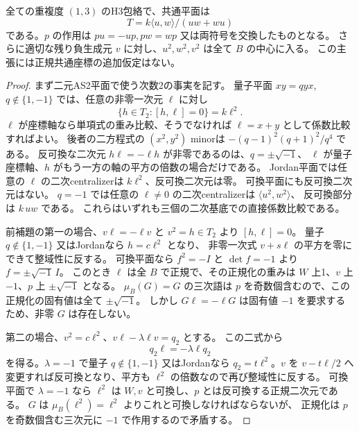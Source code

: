 \begin{theorem}[負三次元側の共通平面は常に量子パラメータ $-1$]
\label{thm:h3-order2-global-minus-one-plane}
全ての重複度 $(1,3)$ のH3包絡で、共通平面は
\[
 T=k\langle u,w\rangle/(uw+wu)
\]
である。$p$ の作用は $pu=-up,pw=wp$ 又は両符号を交換したものとなる。
さらに適切な残り負生成元 $v$ に対し、$u^2,w^2,v^2$ は全て $B$ の中心に入る。
この主張には正規共通座標の追加仮定はない。
\end{theorem}
\begin{proof}
まず二元AS2平面で使う次数2の事実を記す。
量子平面 $xy=qyx$, $q\notin\{1,-1\}$ では、任意の非零一次元 $\ell$ に対し
\[
 \{h\in T_2:[h,\ell]=0\}=k\ell^2.
\]
$\ell$ が座標軸なら単項式の重み比較、そうでなければ $\ell=x+y$ として係数比較すればよい。
後者の二方程式の $(x^2,y^2)$ minorは $-(q-1)^2(q+1)^2/q^4$ である。
反可換な二次元 $h\ell=-\ell h$ が非零であるのは、$q=\pm\sqrt{-1}$、
$\ell$ が量子座標軸、$h$ がもう一方の軸の平方の倍数の場合だけである。
Jordan平面では任意の $\ell$ の二次centralizerは $k\ell^2$、反可換二次元は零。
可換平面にも反可換二次元はない。
$q=-1$ では任意の $\ell\ne0$ の二次centralizerは $\langle u^2,w^2\rangle$、
反可換部分は $k\,uw$ である。
これらはいずれも三個の二次基底での直接係数比較である。

前補題の第一の場合、$v\ell=-\ell v$ と $v^2=h\in T_2$ より $[h,\ell]=0$。
量子 $q\notin\{1,-1\}$ 又はJordanなら $h=c\ell^2$ となり、
非零一次式 $v+s\ell$ の平方を零にできて整域性に反する。
可換平面なら $f^2=-I$ と $\det f=-1$ より $f=\pm\sqrt{-1}\,I$。
このとき $\ell$ は全 $B$ で正規で、その正規化の重みは
$W$ 上1、$v$ 上 $-1$、$p$ 上 $\pm\sqrt{-1}$ となる。
$\mu_B(G)=G$ の三次語は $p$ を奇数個含むので、この正規化の固有値は全て $\pm\sqrt{-1}$。
しかし $G\ell=-\ell G$ は固有値 $-1$ を要求するため、非零 $G$ は存在しない。

第二の場合、$v^2=c\ell^2$、$v\ell-\lambda\ell v=q_2$ とする。
この二式から
\[
 q_2\ell=-\lambda\ell q_2
\]
を得る。$\lambda=-1$ で量子 $q\notin\{1,-1\}$ 又はJordanなら
$q_2=t\ell^2$。$v$ を $v-t\ell/2$ へ変更すれば反可換となり、平方も $\ell^2$ の倍数なので再び整域性に反する。
可換平面で $\lambda=-1$ なら $\ell^2$ は $W,v$ と可換し、$p$ とは反可換する正規二次元である。
$G$ は $\mu_B(\ell^2)=\ell^2$ よりこれと可換しなければならないが、
正規化は $p$ を奇数個含む三次元に $-1$ で作用するので矛盾する。


\end{proof}

